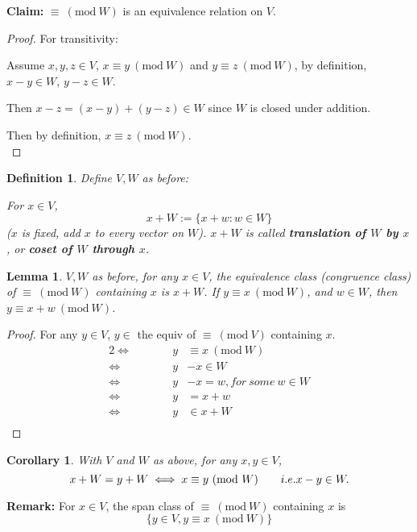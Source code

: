 \documentclass[12pt]{article}
\newtheorem{definition}{Definition}[subsection]
\newtheorem{lemma}{Lemma}[subsection]
\newtheorem{corollary}{Corollary}[subsection]
\newcommand{\Mod}[1]{\ (\mathrm{mod}\ #1)}
\begin{document}
	\textbf{Claim: }$\equiv \Mod W$ is an equivalence relation on $V$. 
	\begin{proof}
		For transitivity: 

		Assume $x, y, z \in V$, $x \equiv y \Mod W$ and $y \equiv z \Mod W$,
		by definition, $x - y \in W$, $y-z\in W$. 

		Then $x - z = (x - y) + (y - z) \in W$ since $W$ is closed under 
		addition. 

	Then by definition, $x \equiv z \Mod W$.\\
	\end{proof}

	\begin{definition}
		Define $V, W$ as before: 
		
		For $x \in V$, 
		\[
			x + W :=\{x + w: w \in W\}
		\]
		($x$ is fixed, add $x$ to every vector on $W$).
		$x + W$ is called \textbf{translation of $W$ by $x$}, or 
		\textbf{coset of $W$ through $x$}. \\
	\end{definition}

	\begin{lemma}
	 $V, W$ as before, for any $x \in V$, the equivalence class
	(congruence class) of $\equiv \Mod W$ containing $x$ is $x + W$. 
	If $y \equiv x \Mod W$, and $w \in W$, then $y \equiv x + w \Mod W$. 
	\end{lemma}
	\begin{proof}
		For any $y \in V$, $y \in$ the equiv of $\equiv \Mod V$ containing $x$.
		\begin{alignat*}{2}
			\iff& \qquad & y & \equiv x \Mod W	\\
			\iff& \qquad & y & - x \in W		\\
			\iff& \qquad & y & - x = w, for \ some \ w \in W\\
			\iff& \qquad & y & = x + w\\
			\iff& \qquad & y & \in x + W\\ 
	\end{alignat*}
	\end{proof}

	\begin{corollary}
		With $V$ and $W$ as above, for any $x, y \in V$, 
		\[
			x + W = y + W \iff x \equiv y \Mod W \qquad i.e. x - y \in W. \\
		\]
	\end{corollary}

	\textbf{Remark:} For $x \in V$, the span class of $\equiv \Mod W$ 
	containing $x$ is 
	\[
		\{y \in V, y\equiv x \Mod W\}
	\]
\end{document}
